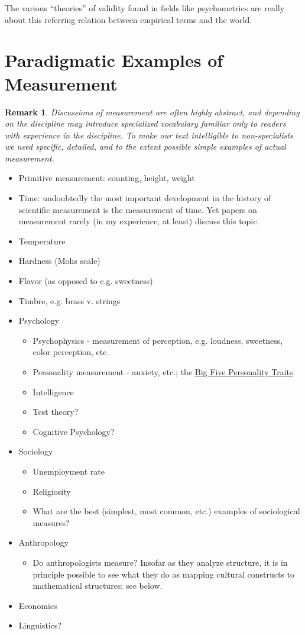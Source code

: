 \documentclass[11pt,twoside]{article}
\newtheorem{remark}{Remark}
\begin{document}
The various ``theories'' of validity found in fields like
psychometrics are really about this referring relation between
empirical terms and the world.  

\section{Paradigmatic Examples of Measurement}

\begin{remark}
Discussions of measurement are often highly abstract, and depending on
the discipline may introduce specialized vocabulary familiar only to
readers with experience in the discipline.  To make our text
intelligible to non-specialists we need specific, detailed, and to the
extent possible simple examples of actual measurement.
\end{remark}

\begin{itemize}
\item Primitive measurement: counting, height, weight
\item Time: undoubtedly the most important development in the history
  of scientific measurement is the measurement of time.  Yet papers on
  measurement rarely (in my experience, at least) discuss this topic.
\item Temperature
\item Hardness (Mohs scale)
\item Flavor (as opposed to e.g. sweetness)
\item Timbre, e.g. brass v. strings
\item Psychology
\begin{itemize}
\item Psychophysics - measurement of perception, e.g. loudness, sweetness, color perception, etc.
\item Personality measurement - anxiety, etc.; the \href{http://en.wikipedia.org/wiki/Big_Five_personality_traits}{Big Five Personality Traits}
\item Intelligence
\item Test theory?
\item Cognitive Psychology?
\end{itemize}
\item Sociology
\begin{itemize}
\item Unemployment rate
\item Religiosity
\item What are the best (simplest, most common, etc.) examples of sociological measures?
\end{itemize}
\item Anthropology
\begin{itemize}
\item Do anthropologists measure?  Insofar as they analyze structure,
  it is in principle possible to see what they do as mapping cultural
  constructs to mathematical structures; see below.
\end{itemize}
\item Economics
\item Linguistics?
\end{itemize}
\end{document}
